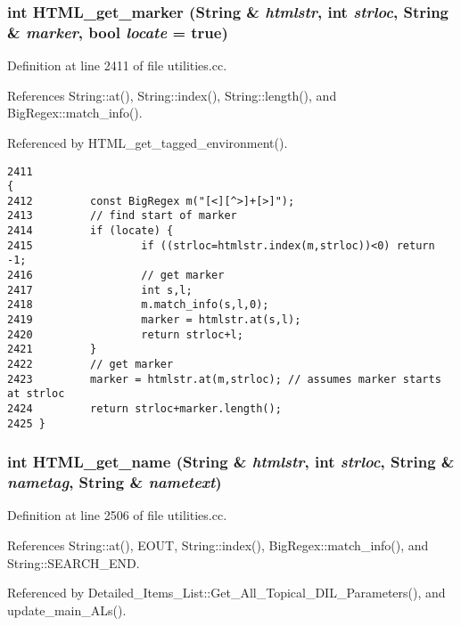 \subsubsection{\setlength{\rightskip}{0pt plus 5cm}int HTML\_\-get\_\-marker ({\bf String} \& {\em htmlstr}, int {\em strloc}, {\bf String} \& {\em marker}, bool {\em locate} = {\bf true})}\label{dil2al_8hh_a250}




Definition at line 2411 of file utilities.cc.

References String::at(), String::index(), String::length(), and Big\-Regex::match\_\-info().

Referenced by HTML\_\-get\_\-tagged\_\-environment().



\footnotesize\begin{verbatim}2411                                                                                       {
2412         const BigRegex m("[<][^>]+[>]");
2413         // find start of marker
2414         if (locate) {
2415                 if ((strloc=htmlstr.index(m,strloc))<0) return -1;
2416                 // get marker
2417                 int s,l;
2418                 m.match_info(s,l,0);
2419                 marker = htmlstr.at(s,l);
2420                 return strloc+l;
2421         }
2422         // get marker
2423         marker = htmlstr.at(m,strloc); // assumes marker starts at strloc
2424         return strloc+marker.length();
2425 }
\end{verbatim}\normalsize 
{}
\subsubsection{\setlength{\rightskip}{0pt plus 5cm}int HTML\_\-get\_\-name ({\bf String} \& {\em htmlstr}, int {\em strloc}, {\bf String} \& {\em nametag}, {\bf String} \& {\em nametext})}\label{dil2al_8hh_a258}




Definition at line 2506 of file utilities.cc.

References String::at(), EOUT, String::index(), Big\-Regex::match\_\-info(), and String::SEARCH\_\-END.

Referenced by Detailed\_\-Items\_\-List::Get\_\-All\_\-Topical\_\-DIL\_\-Parameters(), and update\_\-main\_\-ALs().



